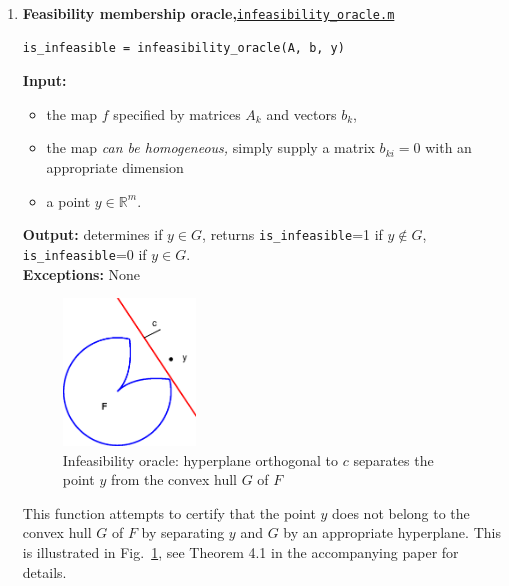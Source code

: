 \documentclass[a4paper]{article}
\theoremstyle{definition}
\begin{document}
\begin{enumerate}
\item {\bf Feasibility membership oracle,\hskip 6pt}\underline{\tt  infeasibility\_oracle.m}
\begin{verbatim}
is_infeasible = infeasibility_oracle(A, b, y)
\end{verbatim}
{\bf Input:}
\begin{itemize}
\item the map $f$ specified by matrices $A_k$ and vectors $b_k$,
\item the map {\it can be homogeneous,} simply supply a matrix $b_{ki}=0$ with an appropriate dimension
\item a point $y\in\mathbb{R}^m$.
\end{itemize}
{\bf Output:} determines if $y\in G$, returns {\tt is\_infeasible}=1 if $y\notin G$, {\tt is\_infeasible}=0 if $y\in G$.\\
{\bf Exceptions:} None

\begin{figure}[H]
	\centering\includegraphics[width=100pt]{fig/infeasibility_oracle}\captionsetup{width=.8\linewidth}
	\caption{Infeasibility oracle: hyperplane orthogonal to $c$ separates the point $y$ from the convex hull $G$ of $F$}
\label{fig:one}
\end{figure}

This function attempts to certify that the point $y$ does not belong to the convex hull $G$ of $F$ by separating $y$ and $G$ by an appropriate hyperplane.
This is illustrated in Fig.~\ref{fig:one}, see Theorem 4.1 in the accompanying paper for details.


\end{enumerate}
\end{document}
